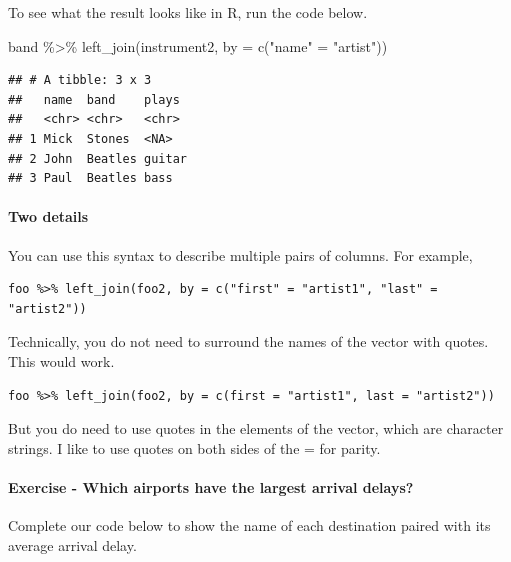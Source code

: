 \documentclass[
]{article}
\newenvironment{Shaded}{\begin{snugshade}}{\end{snugshade}}
\newcommand{\AttributeTok}[1]{\textcolor[rgb]{0.77,0.63,0.00}{#1}}
\newcommand{\FunctionTok}[1]{\textcolor[rgb]{0.00,0.00,0.00}{#1}}
\newcommand{\NormalTok}[1]{#1}
\newcommand{\OtherTok}[1]{\textcolor[rgb]{0.56,0.35,0.01}{#1}}
\newcommand{\SpecialCharTok}[1]{\textcolor[rgb]{0.00,0.00,0.00}{#1}}
\newcommand{\StringTok}[1]{\textcolor[rgb]{0.31,0.60,0.02}{#1}}
\begin{document}
To see what the result looks like in R, run the code below.

\begin{Shaded}
\begin{Highlighting}[]
\NormalTok{band }\SpecialCharTok{\%\textgreater{}\%} \FunctionTok{left\_join}\NormalTok{(instrument2, }\AttributeTok{by =} \FunctionTok{c}\NormalTok{(}\StringTok{"name"} \OtherTok{=} \StringTok{"artist"}\NormalTok{))}
\end{Highlighting}
\end{Shaded}

\begin{verbatim}
## # A tibble: 3 x 3
##   name  band    plays 
##   <chr> <chr>   <chr> 
## 1 Mick  Stones  <NA>  
## 2 John  Beatles guitar
## 3 Paul  Beatles bass
\end{verbatim}

\hypertarget{two-details}{%
\paragraph{Two details}\label{two-details}}

You can use this syntax to describe multiple pairs of columns. For
example,

\begin{verbatim}
foo %>% left_join(foo2, by = c("first" = "artist1", "last" = "artist2"))
\end{verbatim}

Technically, you do not need to surround the names of the vector with
quotes. This would work.

\begin{verbatim}
foo %>% left_join(foo2, by = c(first = "artist1", last = "artist2"))
\end{verbatim}

But you do need to use quotes in the elements of the vector, which are
character strings. I like to use quotes on both sides of the = for
parity.

\hypertarget{exercise---which-airports-have-the-largest-arrival-delays}{%
\paragraph{Exercise - Which airports have the largest arrival
delays?}\label{exercise---which-airports-have-the-largest-arrival-delays}}

Complete our code below to show the name of each destination paired with
its average arrival delay.
\end{document}

